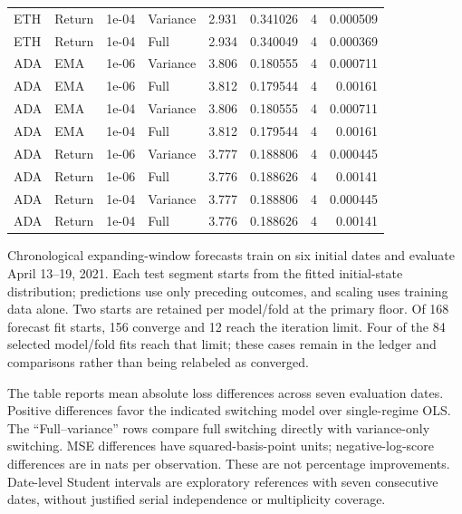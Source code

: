 {\begin{longtable}{llllrrrr}
ETH & Return & 1e-04 & Variance & 2.931 & 0.341026 & 4 & 0.000509\\
ETH & Return & 1e-04 & Full & 2.934 & 0.340049 & 4 & 0.000369\\
ADA & EMA & 1e-06 & Variance & 3.806 & 0.180555 & 4 & 0.000711\\
ADA & EMA & 1e-06 & Full & 3.812 & 0.179544 & 4 & 0.00161\\
ADA & EMA & 1e-04 & Variance & 3.806 & 0.180555 & 4 & 0.000711\\
ADA & EMA & 1e-04 & Full & 3.812 & 0.179544 & 4 & 0.00161\\
ADA & Return & 1e-06 & Variance & 3.777 & 0.188806 & 4 & 0.000445\\
ADA & Return & 1e-06 & Full & 3.776 & 0.188626 & 4 & 0.00141\\
ADA & Return & 1e-04 & Variance & 3.777 & 0.188806 & 4 & 0.000445\\
ADA & Return & 1e-04 & Full & 3.776 & 0.188626 & 4 & 0.00141\\
\end{longtable}
}

Chronological expanding-window forecasts train on six initial dates and evaluate April 13--19, 2021. Each test segment starts from the fitted initial-state distribution; predictions use only preceding outcomes, and scaling uses training data alone. Two starts are retained per model/fold at the primary floor. Of 168 forecast fit starts, 156 converge and 12 reach the iteration limit. Four of the 84 selected model/fold fits reach that limit; these cases remain in the ledger and comparisons rather than being relabeled as converged.

The table reports mean absolute loss differences across seven evaluation dates. Positive differences favor the indicated switching model over single-regime OLS. The ``Full--variance'' rows compare full switching directly with variance-only switching. MSE differences have squared-basis-point units; negative-log-score differences are in nats per observation. These are not percentage improvements. Date-level Student intervals are exploratory references with seven consecutive dates, without justified serial independence or multiplicity coverage.


